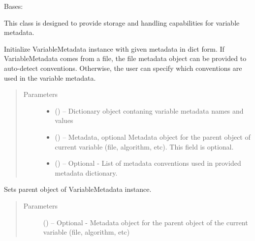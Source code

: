 \documentclass[a4paper,10pt,openany,english]{sphinxmanual}
\begin{document}

\begin{fulllineitems}
\label{egadsapi:egads.core.metadata.VariableMetadata}
Bases: {\hyperref[egadsapi:egads.core.metadata.Metadata]{}}

This class is designed to provide storage and handling capabilities for
variable metadata.

Initialize VariableMetadata instance with given metadata in dict form.
If VariableMetadata comes from a file, the file metadata object can be
provided to auto-detect conventions. Otherwise, the user can specify which
conventions are used in the variable metadata.
\begin{quote}\begin{description}
\item[{Parameters}] \leavevmode\begin{itemize}
\item {} 
 () -- Dictionary object contaning variable metadata names and values

\item {} 
 ({\hyperref[egadsapi:egads.core.metadata.Metadata]{}}) -- Metadata, optional
Metadata object for the parent object of current variable (file,
algorithm, etc). This field is optional.

\item {} 
 () -- Optional -
List of metadata conventions used in provided metadata dictionary.

\end{itemize}

\end{description}\end{quote}

\begin{fulllineitems}
\label{egadsapi:egads.core.metadata.VariableMetadata.set_parent}
Sets parent object of VariableMetadata instance.
\begin{quote}\begin{description}
\item[{Parameters}] \leavevmode
{} ({\hyperref[egadsapi:egads.core.metadata.Metadata]{}}) -- Optional -
Metadata object for the parent object of the current variable (file,
algorithm, etc)


\end{description}
\end{quote}
\end{fulllineitems}
\end{fulllineitems}
\end{document}
